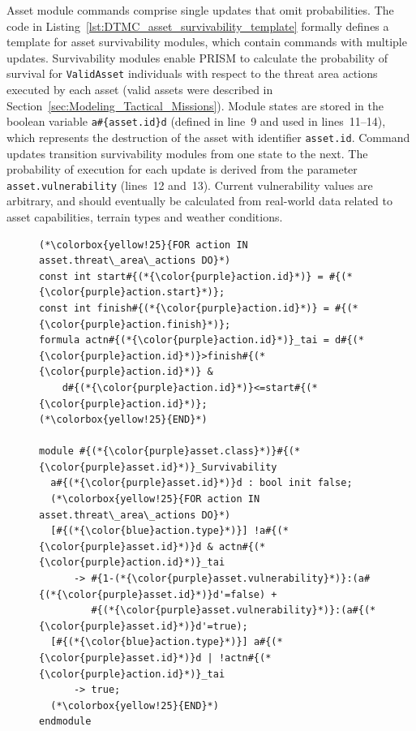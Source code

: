 Asset module commands comprise single updates that omit probabilities. The code in Listing~\ref{lst:DTMC_asset_survivability_template} formally defines a template for asset survivability modules, which contain commands with multiple updates. Survivability modules enable PRISM to calculate the probability of survival for \texttt{ValidAsset} individuals with respect to the threat area actions executed by each asset (valid assets were described in Section~\ref{sec:Modeling_Tactical_Missions}). Module states are stored in the boolean variable \texttt{a\#\{asset.id\}d} (defined in line~9 and used in lines~11--14), which represents the destruction of the asset with identifier \texttt{asset.id}. Command updates transition survivability modules from one state to the next. The probability of execution for each update is derived from the parameter \texttt{asset.vulnerability} (lines~12 and~13). Current vulnerability values are arbitrary, and should eventually be calculated from real-world data related to asset capabilities, terrain types and weather conditions.

\begin{figure}[ht]
\begin{lstlisting}[caption={DTMC template for asset survivability},label=lst:DTMC_asset_survivability_template]
(*\colorbox{yellow!25}{FOR action IN asset.threat\_area\_actions DO}*)
const int start#{(*{\color{purple}action.id}*)} = #{(*{\color{purple}action.start}*)};
const int finish#{(*{\color{purple}action.id}*)} = #{(*{\color{purple}action.finish}*)};
formula actn#{(*{\color{purple}action.id}*)}_tai = d#{(*{\color{purple}action.id}*)}>finish#{(*{\color{purple}action.id}*)} &
    d#{(*{\color{purple}action.id}*)}<=start#{(*{\color{purple}action.id}*)};
(*\colorbox{yellow!25}{END}*)

module #{(*{\color{purple}asset.class}*)}#{(*{\color{purple}asset.id}*)}_Survivability
  a#{(*{\color{purple}asset.id}*)}d : bool init false;
  (*\colorbox{yellow!25}{FOR action IN asset.threat\_area\_actions DO}*)
  [#{(*{\color{blue}action.type}*)}] !a#{(*{\color{purple}asset.id}*)}d & actn#{(*{\color{purple}action.id}*)}_tai
      -> #{1-(*{\color{purple}asset.vulnerability}*)}:(a#{(*{\color{purple}asset.id}*)}d'=false) +
         #{(*{\color{purple}asset.vulnerability}*)}:(a#{(*{\color{purple}asset.id}*)}d'=true);
  [#{(*{\color{blue}action.type}*)}] a#{(*{\color{purple}asset.id}*)}d | !actn#{(*{\color{purple}action.id}*)}_tai
      -> true;
  (*\colorbox{yellow!25}{END}*)
endmodule
\end{lstlisting}
\end{figure}

